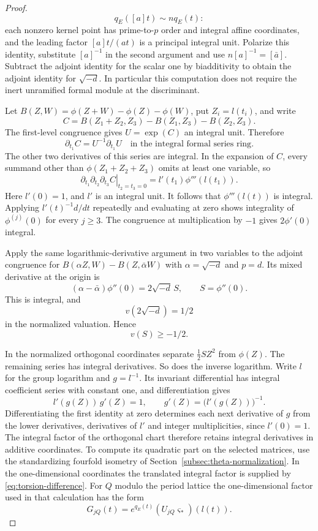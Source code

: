 \begin{proof}
\[
  q_E([a]t)\sim n q_E(t):
\]
 each nonzero kernel point has
prime-to-\(p\) order and integral affine coordinates, and the
leading factor \([a]t/(at)\) is a principal integral unit.
Polarize this identity, substitute \([a]^{-1}\) in the second
argument and use \(n[a]^{-1}=[\bar a]\). Subtract the adjoint
identity for the scalar one by biadditivity to obtain the
adjoint identity for \(\sqrt{-d}\). In particular this computation
does not require the inert unramified formal module at the
discriminant.

Let \(B(Z,W)=\phi(Z+W)-\phi(Z)-\phi(W)\), put
\(Z_i=l(t_i)\), and write
\[
  C=B(Z_1+Z_2,Z_3)-B(Z_1,Z_3)-B(Z_2,Z_3).
\]
The first-level congruence gives \(U=\exp(C)\) an integral
unit. Therefore
\[
 \partial_{t_1} C=U^{-1}\partial_{t_1}U
    \quad\text{in the integral formal series ring}.
\]
The other two derivatives of this series are integral.
In the expansion of \(C\), every summand other than
\(\phi(Z_1+Z_2+Z_3)\) omits at least one variable, so
\[
 \left.\partial_{t_1}\partial_{t_2}\partial_{t_3}C
             \right|_{t_2=t_3=0}
     =l'(t_1)\phi'''(l(t_1)).
\]
Here \(l'(0)=1\), and \(l'\) is an integral unit.
It follows that \(\phi'''(l(t))\) is integral.
Applying \(l'(t)^{-1}d/dt\) repeatedly and evaluating at zero
shows integrality of \(\phi^{(j)}(0)\) for every \(j\ge3\).
The congruence at multiplication by \(-1\) gives
\(2\phi'(0)\) integral.

Apply the same logarithmic-derivative argument in two
variables to the adjoint congruence for
\(B(\alpha Z,W)-B(Z,\bar\alpha W)\) with \(\alpha=\sqrt{-d}\)
and \(p=d\). Its mixed derivative at the origin is
\[
  (\alpha-\bar\alpha)\phi''(0)=2\sqrt{-d}\,S ,
              \qquad S=\phi''(0).
\]
This is integral, and 
\[
  v(2\sqrt{-d})=1/2
\]
 in the normalized
valuation. Hence 
\[
  v(S)\ge-1/2.
\]


In the normalized orthogonal coordinates separate
\(\tfrac12 SZ^2\) from \(\phi(Z)\). The remaining series
has integral derivatives. So does the inverse logarithm.
Write \(l\) for the group logarithm and \(g=l^{-1}\). Its invariant differential has integral coefficient series with constant one, and differentiation gives
\[
  l'(g(Z))\,g'(Z)=1,\qquad g'(Z)=\big(l'(g(Z))\big)^{-1}.
\]
Differentiating the first identity at zero determines each next derivative of \(g\) from the lower derivatives, derivatives of \(l'\) and integer multiplicities, since \(l'(0)=1\).
The integral factor of the orthogonal chart therefore
retains integral derivatives in additive coordinates.
To compute its quadratic part on the selected matrices, use
the standardizing fourfold isometry of
Section~\ref{subsec:theta-normalization}. In the one-dimensional
coordinates the translated integral factor is supplied by
\eqref{eq:torsion-difference}. For \(Q\) modulo the period lattice the one-dimensional factor used in that calculation has the form
\[
  G_{jQ}(t)=e^{q_E(t)}(U_{jQ}\varsigma_*)(l(t)).
\]


\end{proof}
